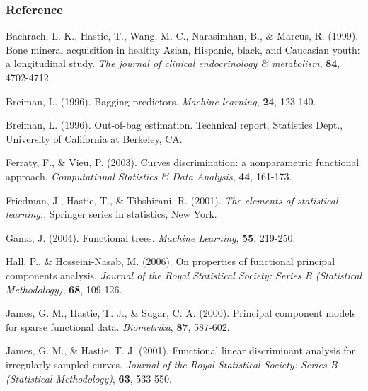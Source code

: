 \documentclass{beamer}
\begin{document}
\begin{frame}[allowframebreaks]
	\frametitle<presentation>{Reference}
	\renewcommand{\section}[2]{}   %
	\begin{thebibliography}{9}
		\footnotesize
		
		Bachrach, L. K., Hastie, T., Wang, M. C., Narasimhan, B., \& Marcus, R. (1999). Bone mineral acquisition in healthy Asian, Hispanic, black, and Caucasian youth: a longitudinal study. {\em The journal of clinical endocrinology \& metabolism}, {\bf 84}, 4702-4712.
		
		Breiman, L. (1996). Bagging predictors. {\em Machine learning}, {\bf 24}, 123-140.
		
		Breiman, L. (1996). Out-of-bag estimation. Technical report, Statistics Dept., University of California at Berkeley, CA.
		
		Ferraty, F., \& Vieu, P. (2003). Curves discrimination: a nonparametric functional approach. {\em Computational Statistics \& Data Analysis}, {\bf 44}, 161-173.
		
		Friedman, J., Hastie, T., \& Tibshirani, R. (2001). {\em The elements of statistical learning.}, Springer series in statistics, New York.
		
		Gama, J. (2004). Functional trees. {\em Machine Learning}, {\bf 55}, 219-250.
		
		Hall, P., \& Hosseini‐Nasab, M. (2006). On properties of functional principal components analysis. {\em Journal of the Royal Statistical Society: Series B (Statistical Methodology)}, {\bf 68}, 109-126.
		
		James, G. M., Hastie, T. J., \& Sugar, C. A. (2000). Principal component models for sparse functional data. {\em Biometrika}, {\bf 87}, 587-602.
		
		James, G. M., \& Hastie, T. J. (2001). Functional linear discriminant analysis for irregularly sampled curves. {\em Journal of the Royal Statistical Society: Series B (Statistical Methodology)}, {\bf 63}, 533-550.
		

\end{thebibliography}
\end{frame}
\end{document}
